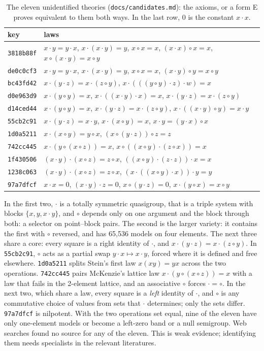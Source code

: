 \documentclass[11pt]{article}
\newcommand{\op}{\cdot}
\newcommand{\cop}{\circ}
\begin{document}
\begin{table}[!htb]\centering\small
\begin{tabular}{lp{}}\toprule
key & laws \\\midrule
\texttt{3818b88f} & $x\op y=y\op x$, $x\op(x\op y)=y$, $x\cop x=x$, $(x\op x)\cop x=x$, $x\cop(x\op y)=x\cop y$ \\
\texttt{de0c0cf3} & $x\op y=y\op x$, $x\op(x\op y)=y$, $x\cop x=x$, $(x\op y)\cop y=x\cop y$ \\
\texttt{bc43fd42} & $x\op(y\op z)=x\op(z\cop y)$, $x\op(((y\cop y)\op z)\op w)=x$ \\
\texttt{d0e963d9} & $x\op(y\cop y)=x$, $x\op((x\op y)\op x)=x$, $x\op(y\op z)=x\op(z\cop y)$ \\
\texttt{d14ced44} & $x\op(y\cop y)=x$, $x\op(y\op z)=x\op(z\cop y)$, $x\op((x\op y)\cop y)=x\op y$ \\
\texttt{55cb2c91} & $x\op(y\op z)=x\op y$, $x\op(x\cop y)=x$, $x\op y=(y\op x)\cop x$ \\
\texttt{1d0a5211} & $x\op(x\cop y)=y\cop x$, $(x\cop(y\op z))\cop z=z$ \\
\texttt{742cc445} & $x\op(y\cop(x\cop z))=x$, $x\cop((x\cop y)\op(z\cop x))=x$ \\
\texttt{1f430506} & $(x\op y)\op(x\cop z)=z\cop x$, $((x\cop y)\op(z\op z))\op x=x$ \\
\texttt{1238c063} & $(x\op y)\op(x\cop z)=z\cop x$, $(x\op((x\cop y)\op x))\op y=y$ \\
\texttt{97a7dfcf} & $x\op x=0$, $(x\op y)\op z=0$, $x\cop(y\op z)=0$, $x\op(y\cop x)=x\cop y$ \\
\bottomrule\end{tabular}
\caption{The eleven unidentified theories (\texttt{docs/candidates.md}): the axioms, or a form E proves equivalent to them
both ways. In the last row, 0 is the constant $x\op x$.}\label{tab:nine}
\end{table}

In the first two, $\op$ is a totally symmetric quasigroup, that is a triple system with blocks $\{x,y,x\op y\}$, and
$\cop$ depends only on one argument and the block through both: a selector on point--block pairs. The second is the
larger variety: it contains the first with $\cop$ reversed, and has 65{,}536 models on four elements. The next three
share a core: every square is a right identity of $\op$, and $x\op(y\op z)=x\op(z\cop y)$. In \texttt{55cb2c91},
$\cop$ acts as a partial swap $y\op x\mapsto x\op y$, forced where it is defined and free elsewhere. \texttt{1d0a5211} splits Stein's first law $x(xy)=yx$ across the two
operations. \texttt{742cc445} pairs McKenzie's lattice law $x\op(y\cop(x\cop z))=x$ with a law that fails in the
2-element lattice, and an associative $\cop$ forces $\op=\cop$. In the next two, which share a law, every square is a
\emph{left} identity of $\op$, and $\cop$ is any commutative choice of values from sets that $\op$ determines; only the
sets differ. \texttt{97a7dfcf} is
nilpotent. With the two
operations set equal, nine of the eleven have only one-element models or become a left-zero band or a null semigroup.
Web searches found no
source for any of the eleven. This is weak evidence; identifying them needs specialists in the relevant literatures.
\end{document}
